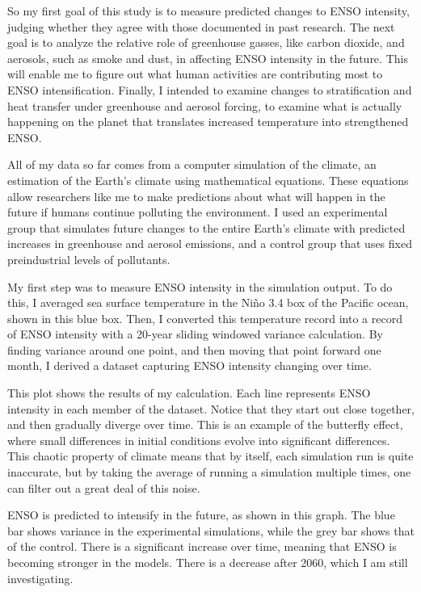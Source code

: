 \documentclass{basic}
\begin{document}
So my first goal of this study is to measure predicted changes to ENSO intensity, judging whether they agree with those documented in past research. The next goal is to analyze the relative role of greenhouse gasses, like carbon dioxide, and aerosols, such as smoke and dust, in affecting ENSO intensity in the future. This will enable me to figure out what human activities are contributing most to ENSO intensification. Finally, I intended to examine changes to stratification and heat transfer under greenhouse and aerosol forcing, to examine what is actually happening on the planet that translates increased temperature into strengthened ENSO.

All of my data so far comes from a computer simulation of the climate, an estimation of the Earth's climate using mathematical equations. These equations allow researchers like me to make predictions about what will happen in the future if humans continue polluting the environment. I used an experimental group that simulates future changes to the entire Earth's climate with predicted increases in greenhouse and aerosol emissions, and a control group that uses fixed preindustrial levels of pollutants.

My first step was to measure ENSO intensity in the simulation output. To do this, I averaged sea surface temperature in the Niño 3.4 box of the Pacific ocean, shown in this blue box. Then, I converted this temperature record into a record of ENSO intensity with a 20-year sliding windowed variance calculation. By finding variance around one point, and then moving that point forward one month, I derived a dataset capturing ENSO intensity changing over time.

This plot shows the results of my calculation. Each line represents ENSO intensity in each member of the dataset. Notice that they start out close together, and then gradually diverge over time. This is an example of the butterfly effect, where small differences in initial conditions evolve into significant differences. This chaotic property of climate means that by itself, each simulation run is quite inaccurate, but by taking the average of running a simulation multiple times, one can filter out a great deal of this noise.

ENSO is predicted to intensify in the future, as shown in this graph. The blue bar shows variance in the experimental simulations, while the grey bar shows that of the control. There is a significant increase over time, meaning that ENSO is becoming stronger in the models. There is a decrease after 2060, which I am still investigating.
\end{document}
